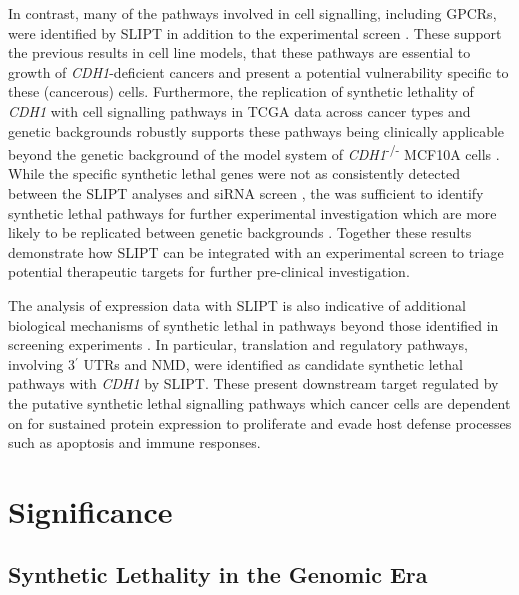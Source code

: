 In contrast, many of the pathways involved in cell signalling, including \glspl{GPCR}, were identified by \gls{SLIPT} in addition to the experimental screen \citep{Telford2015}. These support the previous results in cell line models, that these pathways are essential to growth of \textit{CDH1}-deficient cancers and present a potential vulnerability specific to these (cancerous) cells. Furthermore, the replication of synthetic lethality of \textit{CDH1} with cell signalling pathways in \gls{TCGA} data across cancer types and genetic backgrounds robustly supports these pathways being clinically applicable beyond the genetic background of the model system of \textit{CDH1}\textsuperscript{-/-} MCF10A cells \citep{Chen2014}. While the specific synthetic lethal genes were not as consistently detected between the \gls{SLIPT} analyses and \gls{siRNA} screen \citep{Telford2015}, the was sufficient to identify synthetic lethal pathways for further experimental investigation which are more likely to be replicated between genetic backgrounds \citep{Dixon2008}. Together these results demonstrate how \gls{SLIPT} can be integrated with an experimental screen to triage potential therapeutic targets  for further pre-clinical investigation.

The analysis of expression data with \gls{SLIPT} is also indicative of additional biological mechanisms of synthetic lethal in pathways beyond those identified in screening experiments \citep{Telford2015}. In particular, translation and regulatory pathways, involving 3$^\prime$ \glspl{UTR} and \gls{NMD}, were identified as candidate synthetic lethal pathways with \textit{CDH1} by \gls{SLIPT}. These present downstream target regulated by the putative synthetic lethal signalling pathways which cancer cells are dependent on for sustained protein expression \citep{Gao2015} to proliferate and evade host defense processes such as apoptosis and immune responses. 



\section{Significance}
\label{chapt6:significance}

\subsection{Synthetic Lethality in the Genomic Era}
\label{chapt6:significance_genetics}

